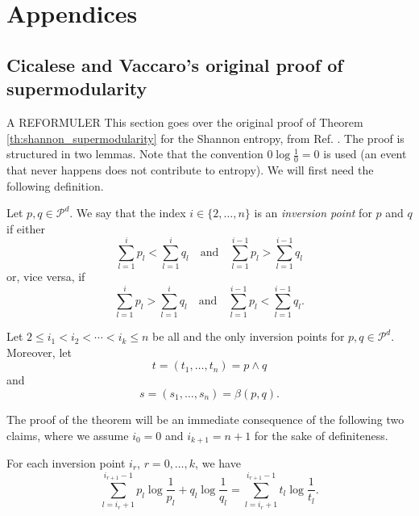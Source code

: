 \appendix
\chapter*{Appendices}
\renewcommand{\thesection}{\Alph{section}}
\renewcommand{\theequation}{\thesection.\arabic{equation}}



\section{Cicalese and Vaccaro's original proof of supermodularity}

A REFORMULER This section goes over the original proof of Theorem \ref{th:shannon_supermodularity} for the Shannon entropy, from Ref. \cite{cicalese_supermodularity_2002}. The proof is structured in two lemmas. Note that the convention $0 \log \frac{1}{0} = 0$ is used (an event that never happens does not contribute to entropy). We will first need the following definition.

\begin{appendix_definition}
    Let $p, q \in \mathcal{P}^d$. We say that the index $i \in \{2, \ldots, n\}$ is an \emph{inversion point} for $p$ and $q$ if either
\begin{equation}
    \sum_{l=1}^{i} p_l < \sum_{l=1}^{i} q_l \quad \text{and} \quad \sum_{l=1}^{i-1} p_l > \sum_{l=1}^{i-1} q_l    
\end{equation}
or, vice versa, if
\begin{equation}
    \sum_{l=1}^{i} p_l > \sum_{l=1}^{i} q_l \quad \text{and} \quad \sum_{l=1}^{i-1} p_l < \sum_{l=1}^{i-1} q_l.
\end{equation}
\end{appendix_definition}

Let $2 \leq i_1 < i_2 < \cdots < i_k \leq n$ be all and the only inversion points for $p, q \in \mathcal{P}^d$. Moreover, let
\begin{equation}
    t = (t_1, \ldots, t_n) = p \wedge q
\end{equation}
and
\begin{equation}
    s = (s_1, \ldots, s_n) = \beta(p, q).
\end{equation}

The proof of the theorem will be an immediate consequence of the following two claims, where we assume $i_0 = 0$ and $i_{k+1} = n + 1$ for the sake of definiteness. 

\begin{appendix_lemma} \label{lem:shannon_1}
    For each inversion point $i_r$, $r = 0, \ldots, k$, we have
    \begin{equation}
        \sum_{l=i_r+1}^{i_{r+1}-1} p_l \log \frac{1}{p_l} + q_l \log \frac{1}{q_l} = \sum_{l=i_r+1}^{i_{r+1}-1} t_l \log \frac{1}{t_l}.
    \end{equation}
\end{appendix_lemma} 

